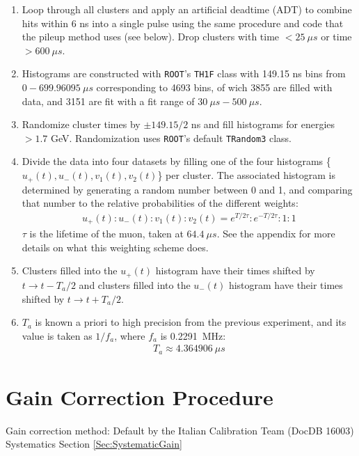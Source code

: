 	\begin{enumerate}
		\item{Loop through all clusters and apply an artificial deadtime (ADT) to combine hits within 6 ns into a single pulse using the same procedure and code that the pileup method uses (see below). Drop clusters with time $< \SI{25}{\mu s}$ or time $> \SI{600}{\mu s}$.}
		\item{Histograms are constructed with \texttt{ROOT}'s \texttt{TH1F} class with 149.15 ns bins from $0 - \SI{699.96095}{\mu s}$ corresponding to 4693 bins, of wich 3855 are filled with data, and 3151 are fit with a fit range of $\SI{30}{\mu s} - \SI{500}{\mu s}$.}
		\item{Randomize cluster times by $\pm 149.15/2$ ns and fill histograms for energies $> 1.7$ GeV. Randomization uses \texttt{ROOT}'s default \texttt{TRandom3} class.}
		\item{Divide the data into four datasets by filling one of the four histograms \{$u_{+}(t), u_{-}(t), v_{1}(t), v_{2}(t)$\} per cluster. The associated histogram is determined by generating a random number between 0 and 1, and comparing that number to the relative probabilities of the different weights:
			\begin{align}
				u_{+}(t) : u_{-}(t) : v_{1}(t) : v_{2}(t) = e^{T/2\tau} : e^{-T/2\tau} : 1 : 1
			\end{align}
		$\tau$ is the lifetime of the muon, taken at $\SI{64.4}{\mu s}$. See the appendix for more details on what this weighting scheme does.}
		\item{Clusters filled into the $u_{+}(t)$ histogram have their times shifted by $t \rightarrow t - T_{a}/2$ and clusters filled into the $u_{-}(t)$ histogram have their times shifted by $t \rightarrow t + T_{a}/2$.}
		\item{$T_{a}$ is known a priori to high precision from the previous experiment, and its value is taken as $1/f_{a}$, where $f_{a}$ is \SI{0.2291}{MHz}:
			\begin{align}
				T_{a} \approx \SI{4.364906}{\mu s}
			\label{eq:Ta}
			\end{align}}
	\end{enumerate}

\section{Gain Correction Procedure}

	Gain correction method: Default by the Italian Calibration Team (DocDB 16003) \\
	\noindent Systematics Section \ref{Sec:SystematicGain}


